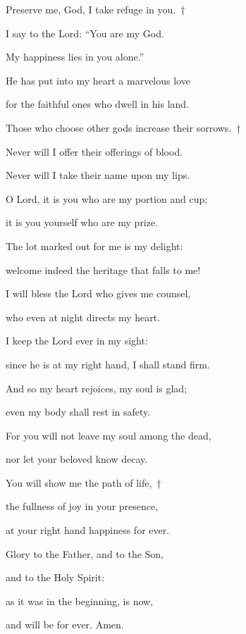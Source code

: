 \noindent Preserve me, God, I take refuge in you.~†~\nopagebreak

I say to the Lord: “You are my God. ~\GreStar{}~\nopagebreak

My happiness lies in you alone.”

\noindent He has put into my heart a marvelous love ~\GreStar{}~\nopagebreak

for the faithful ones who dwell in his land.

\noindent Those who choose other gods increase their sorrows.~†~\nopagebreak

Never will I offer their offerings of blood. ~\GreStar{}~\nopagebreak

Never will I take their name upon my lips.

\noindent O Lord, it is you who are my portion and cup; ~\GreStar{}~\nopagebreak

it is you yourself who are my prize.

\noindent The lot marked out for me is my delight: ~\GreStar{}~\nopagebreak

welcome indeed the heritage that falls to me!

\noindent I will bless the Lord who gives me counsel, ~\GreStar{}~\nopagebreak

who even at night directs my heart.

\noindent I keep the Lord ever in my sight: ~\GreStar{}~\nopagebreak

since he is at my right hand, I shall stand firm.

\noindent And so my heart rejoices, my soul is glad; ~\GreStar{}~\nopagebreak

even my body shall rest in safety.

\noindent For you will not leave my soul among the dead, ~\GreStar{}~\nopagebreak

nor let your beloved know decay.

\noindent You will show me the path of life,~†~\nopagebreak

the fullness of joy in your presence, ~\GreStar{}~\nopagebreak

at your right hand happiness for ever.

\noindent Glory to the Father, and to the Son,~\GreStar{}~\nopagebreak

and to the Holy Spirit:

\noindent as it was in the beginning, is now,~\GreStar{}~\nopagebreak

and will be for ever. Amen.
